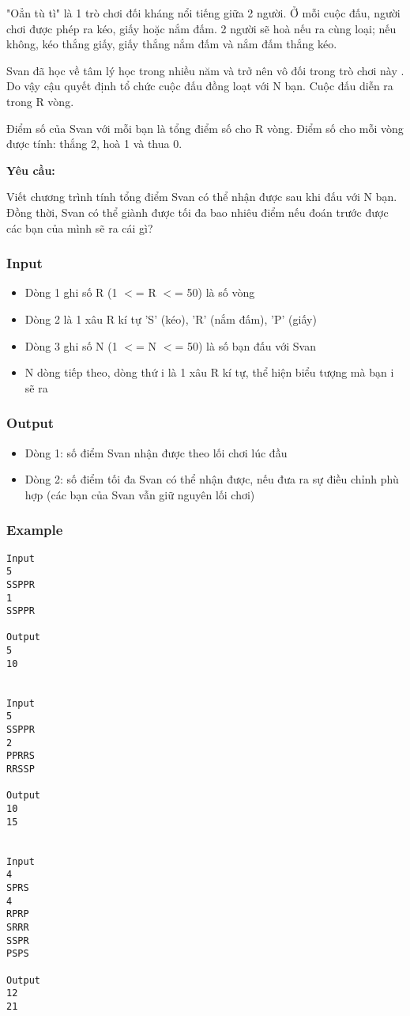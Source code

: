 

"Oẳn tù tì" là 1 trò chơi đối kháng nổi tiếng giữa 2 người. Ở mỗi cuộc đấu, người chơi được phép ra kéo, giấy hoặc nắm đấm. 2 người sẽ hoà nếu ra cùng loại; nếu không, kéo thắng giấy, giấy thắng nắm đấm và nắm đấm thắng kéo.

Svan đã học về tâm lý học trong nhiều năm và trở nên vô đối trong trò chơi này . Do vậy cậu quyết định tổ chức cuộc đấu đồng loạt với N bạn. Cuộc đấu diễn ra trong R vòng.

Điểm số của Svan với mỗi bạn là tổng điểm số cho R vòng. Điểm số cho mỗi vòng được tính: thắng 2, hoà 1 và thua 0.

\textbf{Yêu cầu:}

Viết chương trình tính tổng điểm Svan có thể nhận được sau khi đấu với N bạn. Đồng thời, Svan có thể giành được tối đa bao nhiêu điểm nếu đoán trước được các bạn của mình sẽ ra cái gì?

\subsubsection{Input}
\begin{itemize}
	\item Dòng 1 ghi số R (1 $<$= R $<$= 50) là số vòng
	\item Dòng 2 là 1 xâu R kí tự 'S' (kéo), 'R' (nắm đấm), 'P' (giấy)
	\item Dòng 3 ghi số N (1 $<$= N $<$= 50) là số bạn đấu với Svan
	\item N dòng tiếp theo, dòng thứ i là 1 xâu R kí tự, thể hiện biểu tượng mà bạn i sẽ ra
\end{itemize}

\subsubsection{Output}
\begin{itemize}
	\item Dòng 1: số điểm Svan nhận được theo lối chơi lúc đầu
	\item Dòng 2: số điểm tối đa Svan có thể nhận được, nếu đưa ra sự điều chỉnh phù hợp (các bạn của Svan vẫn giữ nguyên lối chơi)
\end{itemize}

\subsubsection{Example}
\begin{verbatim}
Input
5
SSPPR
1
SSPPR

Output
5
10


Input
5
SSPPR
2
PPRRS
RRSSP

Output
10
15


Input
4
SPRS
4
RPRP
SRRR
SSPR
PSPS

Output
12
21
\end{verbatim}

